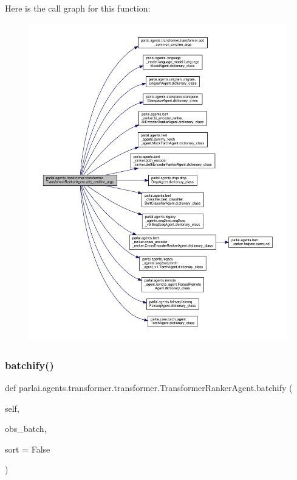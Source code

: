 Here is the call graph for this function\+:
\nopagebreak
\begin{figure}[H]
\begin{center}
\leavevmode
\includegraphics[width=350pt]{classparlai_1_1agents_1_1transformer_1_1transformer_1_1TransformerRankerAgent_a6836668a4c2394d7217631fed533a7ac_cgraph}
\end{center}
\end{figure}
\mbox{\label{classparlai_1_1agents_1_1transformer_1_1transformer_1_1TransformerRankerAgent_a2592aa2dc8469ab671656597b4ba48a8}} 
\subsubsection{\texorpdfstring{batchify()}{batchify()}}
{\footnotesize\ttfamily def parlai.\+agents.\+transformer.\+transformer.\+Transformer\+Ranker\+Agent.\+batchify (\begin{DoxyParamCaption}\item[{}]{self,  }\item[{}]{obs\+\_\+batch,  }\item[{}]{sort = {\ttfamily False} }\end{DoxyParamCaption})}

